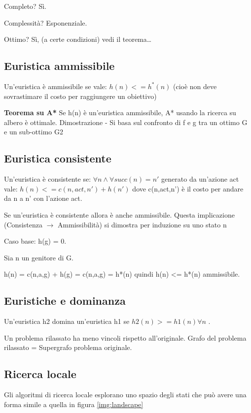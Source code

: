 Completo? Sì.

Complessità? Esponenziale.

Ottimo? Sì, (a certe condizioni) vedi il teorema\dots

\subsection{Euristica ammissibile}

Un'euristica è ammissibile se vale: $h(n) <= h^*(n)$
(cioè non deve sovrastimare il costo per raggiungere un obiettivo)

\textbf{Teorema su A*}
Se h(n) è un'euristica ammissibile,  A* usando la ricerca su albero è ottimale.
Dimostrazione - Si basa sul confronto di f e g tra un ottimo G e un sub-ottimo G2

\subsection{Euristica consistente}

Un'euristica è consistente se:
$\forall n \land \forall succ(n) = n'$ generato da un'azione act vale:
$h(n) <= c(n,act,n') + h(n')$
dove c(n,act,n') è il costo per andare da n a n' con l'azione act.

Se un'euristica è consistente allora è anche ammissibile.
Questa implicazione (Consistenza $\rightarrow$ Ammissibilità) si dimostra per
induzione su uno stato n

Caso base:
h(g) = 0.

Sia n un genitore di G.

h(n) = c(n,a,g) + h(g) = c(n,a,g) = h*(n) quindi h(n) <= h*(n) ammissibile.

\subsection{Euristiche e dominanza}

Un'euristica h2 domina un'euristica h1 se $h2(n) >= h1(n) \forall n$ .

Un problema rilassato ha meno vincoli rispetto all'originale.
Grafo del problema rilassato = Supergrafo problema originale.

\subsection{Ricerca locale}

Gli algoritmi di ricerca locale esplorano uno spazio degli stati che può avere
una forma simile a quella in figura \ref{img:landscape}

